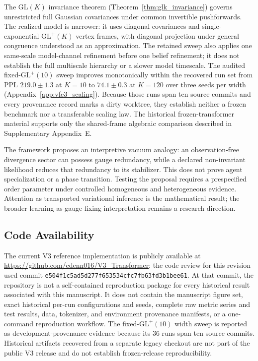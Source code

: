 \documentclass[twoside,11pt]{article}
\begin{document}
The $\mathrm{GL}(K)$ invariance theorem (Theorem~\ref{thm:glk_invariance}) governs unrestricted full Gaussian covariances under common invertible pushforwards. The realized model is narrower: it uses diagonal covariances and single-exponential $\mathrm{GL}^+(K)$ vertex frames, with diagonal projection under general congruence understood as an approximation. The retained sweep also applies one same-scale model-channel refinement before one belief refinement; it does not establish the full multiscale hierarchy or a slower model timescale. The audited fixed-$\mathrm{GL}^+(10)$ sweep improves monotonically within the recovered run set from PPL $219.0\pm1.3$ at $K=10$ to $74.1\pm0.3$ at $K=120$ over three seeds per width (Appendix~\ref{app:vfe3_scaling}). Because those runs span ten source commits and every provenance record marks a dirty worktree, they establish neither a frozen benchmark nor a transferable scaling law. The historical frozen-transformer material supports only the shared-frame algebraic comparison described in Supplementary Appendix~E.

The framework proposes an interpretive vacuum analogy: an observation-free divergence sector can possess gauge redundancy, while a declared non-invariant likelihood reduces that redundancy to its stabilizer. This does not prove agent specialization or a phase transition. Testing the proposal requires a prespecified order parameter under controlled homogeneous and heterogeneous evidence. Attention as transported variational inference is the mathematical result; the broader learning-as-gauge-fixing interpretation remains a research direction.


\subsection{Code Availability}
The current V3 reference implementation is publicly available at \url{https://github.com/cdenn016/V3_Transformer}; the code review for this revision used commit \texttt{e504f1c5ad5d277f653534cfc7fb63fd3b1bee61}. At that commit, the repository is not a self-contained reproduction package for every historical result associated with this manuscript. It does not contain the manuscript figure set, exact historical per-run configurations and seeds, complete raw metric series and test results, data, tokenizer, and environment provenance manifests, or a one-command reproduction workflow. The fixed-$\mathrm{GL}^+(10)$ width sweep is reported as development-provenance evidence because its 36 runs span ten source commits. Historical artifacts recovered from a separate legacy checkout are not part of the public V3 release and do not establish frozen-release reproducibility.
\end{document}
